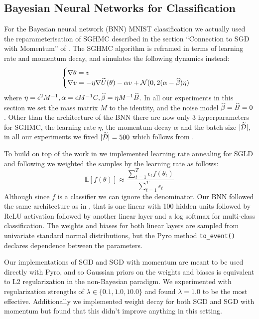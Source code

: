 \subsection{Bayesian Neural Networks for Classification}
For the Bayesian neural network (BNN) MNIST classification we actually used the reparameterisation of SGHMC described in the section ``Connection to SGD with Momentum'' of \cite{sghmc}. The SGHMC algorithm is reframed in terms of learning rate and momentum decay, and simulates the following dynamics instead:
$$\begin{cases}
\nabla \theta = v\\
\nabla v = - \eta \nabla \widetilde{U}(\theta) - \alpha v + \mathcal{N}(0, 2(\alpha - \widehat{\beta}) \eta)
\end{cases}
$$
where $\eta = \epsilon^2 M^{-1}, \alpha = \epsilon M^{-1}C, \widehat{\beta} = \eta M^{-1}\widehat{B}$. In all our experiments in this section we set the mass matrix $M $ to the identity, and the noise model $\widehat{\beta} = \widehat{B} = 0$. Other than the architecture of the BNN there are now only 3 hyperparameters for SGHMC, the learning rate $\eta$, the momentum decay $\alpha$ and the batch size $|\widetilde{\mathcal{D}}|$, in all our experiments we fixed $|\widetilde{\mathcal{D}}| = 500$ which follows from \cite{sghmc}.

To build on top of the work in \cite{sghmc} we implemented learning rate annealing for SGLD and following \cite{sgld} we weighted the samples by the learning rate as follows:
$$\mathbb{E}[f(\theta)] \approx \frac{\sum^T_{t=1} \epsilon_t f(\theta_t)}{\sum^T_{t=1} \epsilon_t}$$
Although since $f$ is a classifier we can ignore the denominator. Our BNN followed the same architecture as in \cite{sghmc}, that is one linear with 100 hidden units followed by ReLU activation followed by another linear layer and a log softmax for multi-class classification. The weights and biases for both linear layers are sampled from univariate standard normal distributions, but the Pyro method \texttt{to\_event()} declares dependence between the parameters. 

Our implementations of SGD and SGD with momentum are meant to be used directly with Pyro, and so Gaussian priors on the weights and biases is equivalent to L2 regularization in the non-Bayesian paradigm. We experimented with regularization strengths of $\lambda \in \{0.1, 1.0, 10.0\}$ and found $\lambda = 1.0$ to be the most effective. Additionally we implemented weight decay for both SGD and SGD with momentum but found that this didn't improve anything in this setting.

